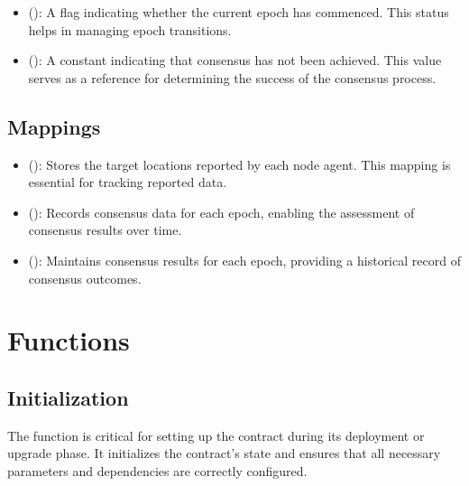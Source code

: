\documentclass[letterpaper,10pt,english]{sphinxmanual}
\begin{document}
\begin{itemize}
\item {} 
\sphinxAtStartPar
{} ():
A flag indicating whether the current epoch has commenced. This status helps in managing epoch transitions.

\item {} 
\sphinxAtStartPar
{} ():
A constant indicating that consensus has not been achieved. This value serves as a reference for determining the success of the consensus process.

\end{itemize}


\subsection{Mappings}
\label{\detokenize{docs_consensus_mechanism_contract:mappings}}\begin{itemize}
\item {} 
\sphinxAtStartPar
{} ():
Stores the target locations reported by each node agent. This mapping is essential for tracking reported data.

\item {} 
\sphinxAtStartPar
{} ():
Records consensus data for each epoch, enabling the assessment of consensus results over time.

\item {} 
\sphinxAtStartPar
{} ():
Maintains consensus results for each epoch, providing a historical record of consensus outcomes.

\end{itemize}


\section{Functions}
\label{\detokenize{docs_consensus_mechanism_contract:functions}}

\subsection{Initialization}
\label{\detokenize{docs_consensus_mechanism_contract:initialization}}
\sphinxAtStartPar
The  function is critical for setting up the contract during its deployment or upgrade phase. It initializes the contract’s state and ensures that all necessary parameters and dependencies are correctly configured.
\end{document}
